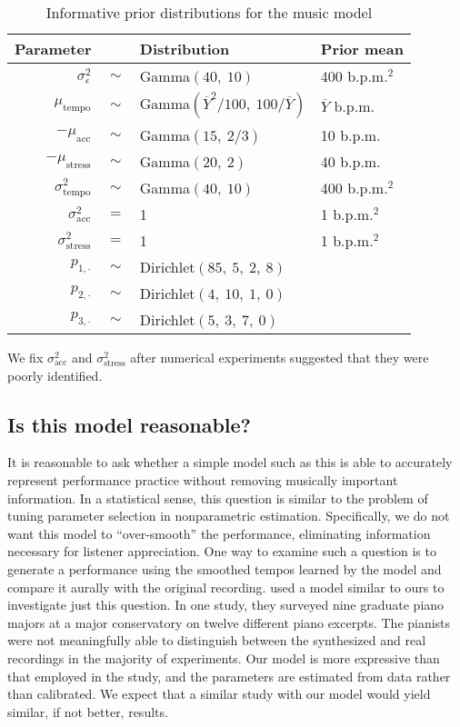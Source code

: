 \documentclass[12pt]{article}
\begin{document}
\begin{table}[t]
  \centering
  \begin{tabular}{@{}rcll@{}}
    \toprule
    Parameter & \phantom{a} & Distribution & Prior mean\\
    \midrule
    $\sigma^2_{\epsilon}$ & $\sim$ & Gamma$(40,\ 10)$ & 400 b.p.m.$^2$\\
    $\mu_{\textrm{tempo}}$ & $\sim$ & Gamma$(\overline{Y}^2/100,\ 100
                                      /\overline{Y})$ & $\overline{Y}$
                                                        b.p.m.\\
    $-\mu_{\textrm{acc}} $ & $\sim$ & Gamma$(15,\ 2/3)$ & 10 b.p.m.\\
    $-\mu_{\textrm{stress}} $ & $\sim$ & Gamma$(20,\ 2)$ & 40 b.p.m.\\
    $\sigma^2_{\textrm{tempo}} $ & $\sim$ & Gamma$(40,\ 10)$ & 400
                                                               b.p.m.$^2$\\
    $\sigma^2_{\textrm{acc}} $ & $=$ & 1 & 1 b.p.m.$^2$\\
    $\sigma^2_{\textrm{stress}} $ & $=$ & 1 & 1 b.p.m.$^2$\\
    $p_{1,\cdot}$ & $\sim$ & Dirichlet$(85,\ 5,\ 2,\ 8)$ \\
    $p_{2,\cdot}$ & $\sim$ & Dirichlet$(4,\ 10,\ 1,\ 0)$ \\
    $p_{3,\cdot}$ & $\sim$ & Dirichlet$(5,\ 3,\ 7,\ 0)$ \\
    \bottomrule
  \end{tabular}
  \caption{Informative prior distributions for the music model}
  \label{tab:priors}
\end{table}
We fix $\sigma^2_{\textrm{acc}}$ and $\sigma^2_{\textrm{stress}}$ after numerical experiments suggested
that they were poorly identified.

\subsection{Is this model reasonable?}

It is reasonable to ask whether a simple model such as this is able to
accurately represent performance practice without removing musically important
information. In a statistical sense, this question is similar to the
problem of tuning parameter selection in nonparametric
estimation. Specifically, we do not want this model to
``over-smooth'' the performance, eliminating information necessary for
listener appreciation. One way to examine such a question 
is to generate a performance using the smoothed tempos learned by
the model and compare it aurally with the original recording.
\citet{GuRaphael2012} used a model similar to ours to investigate just
this question. In one study, they surveyed nine graduate piano majors at a
major conservatory on twelve different piano excerpts. The pianists
were not meaningfully able to distinguish between the synthesized and
real recordings in the majority of experiments. Our model is more
expressive than that employed in the study, and the parameters are
estimated from data rather than calibrated. We expect that a similar
study with our model would yield similar, if not better, results.
\end{document}
